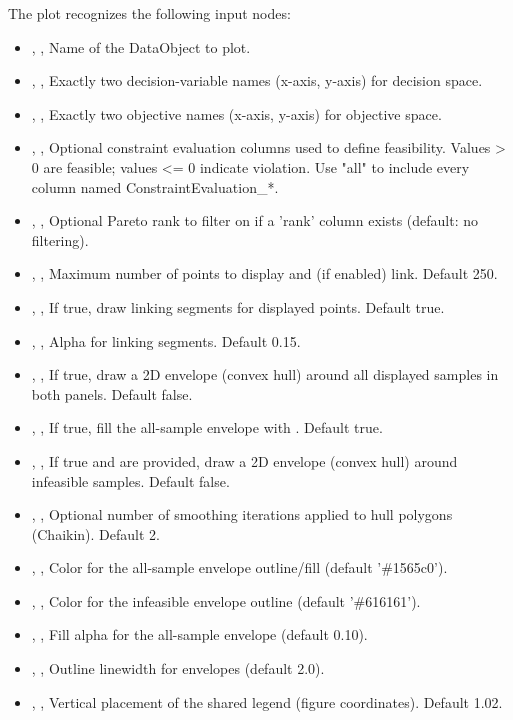 The  plot recognizes the following input nodes:
\begin{itemize}
  \item {}, , Name of the DataObject to plot.
  \item {}, , Exactly two decision-variable names (x-axis, y-axis) for decision space.
  \item {}, , Exactly two objective names (x-axis, y-axis) for objective space.
  \item {}, , Optional constraint evaluation columns used to define feasibility. Values \textgreater{} 0 are feasible; values \textless{}= 0 indicate violation. Use "all" to include every column named ConstraintEvaluation\_*.
  \item {}, , Optional Pareto rank to filter on if a 'rank' column exists (default: no filtering).
  \item {}, , Maximum number of points to display and (if enabled) link. Default 250.
  \item {}, , If true, draw linking segments for displayed points. Default true.
  \item {}, , Alpha for linking segments. Default 0.15.
  \item {}, , If true, draw a 2D envelope (convex hull) around all displayed samples in both panels. Default false.
  \item {}, , If true, fill the all-sample envelope with . Default true.
  \item {}, , If true and  are provided, draw a 2D envelope (convex hull) around infeasible samples. Default false.
  \item {}, , Optional number of smoothing iterations applied to hull polygons (Chaikin). Default 2.
  \item {}, , Color for the all-sample envelope outline/fill (default '\#1565c0').
  \item {}, , Color for the infeasible envelope outline (default '\#616161').
  \item {}, , Fill alpha for the all-sample envelope (default 0.10).
  \item {}, , Outline linewidth for envelopes (default 2.0).
  \item {}, , Vertical placement of the shared legend (figure coordinates). Default 1.02.
\end{itemize}

